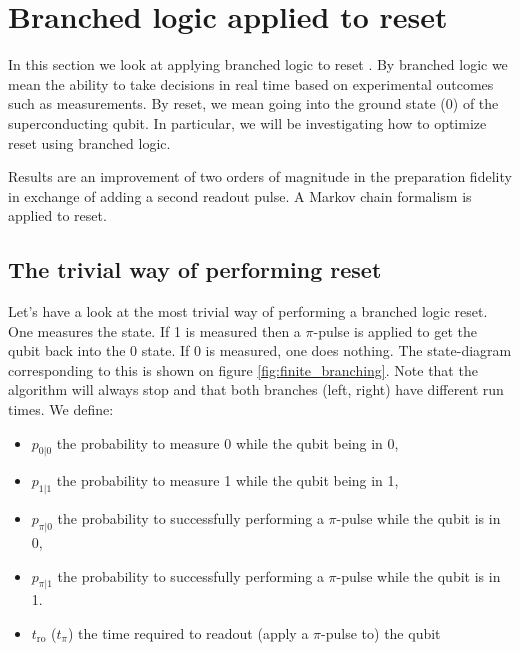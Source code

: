 \chapter{Branched logic applied to reset}\label{chap:branched_logic}

In this section we look at applying branched logic to reset . By branched logic we mean the ability to take decisions in real time based on experimental outcomes such as measurements. By reset, we mean going into the ground state (0) of the superconducting qubit. In particular, we will be investigating how to optimize reset using branched logic. 

Results are an improvement of two orders of magnitude in the preparation fidelity in exchange of adding a second readout pulse. A Markov chain formalism is applied to reset. 

\section{The trivial way of performing reset} \label{sec:branched_logic}

Let's have a look at the most trivial way of performing a branched logic reset. One measures the state. If 1 is measured then a $\pi$-pulse is applied to get the qubit back into the 0 state. If 0 is measured, one does nothing. The state-diagram corresponding to this is shown on figure  \ref{fig:finite_branching}. Note that the algorithm will always stop and that both branches (left, right) have different run times. We define:
\begin{itemize}
    \item $p_{0|0}$ the probability to measure 0 while the qubit being in 0,
    \item $p_{1|1}$ the probability to measure 1 while the qubit being in 1,
    \item $p_{\pi|0}$ the probability to successfully performing a $\pi$-pulse while the qubit is in 0,  
    \item $p_{\pi|1}$ the probability to successfully performing a $\pi$-pulse while the qubit is in 1.
    \item $t_\mathrm{ro}$ ($t_\pi$) the time required to readout (apply a $\pi$-pulse to) the qubit

\end{itemize}

